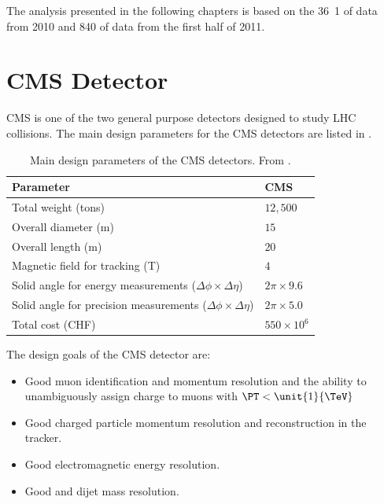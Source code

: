 The analysis presented in the following chapters is based on the \unit{36.1} of
data from  2010 and \unit{840}{\invpb} of data from the first half of 2011.

\section{CMS Detector}
{CMS} is one of the two general purpose
detectors designed to study LHC collisions. The main design parameters for the
{CMS} detectors  are listed in .

\begin{table}[htbp]
\begin{center}
\begin{tabular}{ l l }
\toprule
Parameter & CMS \\
\midrule
Total weight (tons)                 & $12,500$  \\
Overall diameter (m)                & $15$  \\
Overall length (m)                  & $20$  \\
Magnetic field for tracking (T)     & $4$  \\
Solid angle for energy measurements ($\Delta\phi \times \Delta\eta$)   
                                    & $2\pi \times 9.6$  \\
Solid angle for precision measurements ($\Delta\phi \times \Delta\eta$)   
                                    & $2\pi \times 5.0$  \\
Total cost (CHF)                    & $550\times 10 ^{6}$  \\
\bottomrule
\end{tabular}
\caption{Main design parameters of the CMS detectors. From
\cite{froidevaux2006general}.\label{tab:cmsparam}}
\end{center}
\end{table}

The design goals of the CMS detector are:\cite{chatrchyan2008cms}
\begin{itemize}
  \item Good muon identification and momentum resolution and the ability to
unambiguously assign charge to muons with $\PT < \unit{1}{\TeV}$
  \item Good charged particle momentum resolution and reconstruction in the
tracker.
  \item Good electromagnetic energy resolution. 
  \item Good \ETmiss and dijet mass resolution.
\end{itemize}

